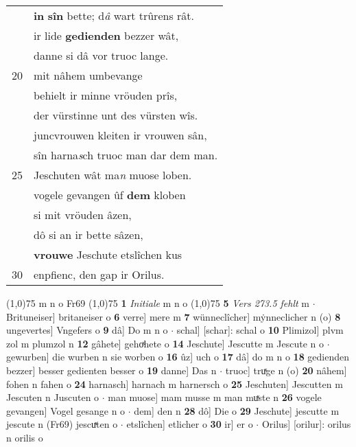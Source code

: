 \documentclass[8pt,a4paper,notitlepage]{article}
\begin{document}
\begin{table}[ht]
\begin{minipage}[t]{0.5\linewidth}
\begin{tabular}{rl}
 & \textbf{in} \textbf{sîn} bette; d\textit{â} wart trûrens rât.\\ 
 & ir lide \textbf{gedienden} bezzer wât,\\ 
 & danne si dâ vor truoc lange.\\ 
20 & mit nâhem umbevange\\ 
 & behielt ir minne vröuden prîs,\\ 
 & der vürstinne unt des vürsten wîs.\\ 
 & juncvrouwen kleiten ir vrouwen sân,\\ 
 & sîn harna\textit{s}ch truoc man dar dem man.\\ 
25 & Jeschuten wât ma\textit{n} muose loben.\\ 
 & vogele gevangen ûf \textbf{dem} kloben\\ 
 & si mit vröuden âzen,\\ 
 & dô si an ir bette sâzen,\\ 
 & \textbf{vrouwe} Jeschute etslîchen kus\\ 
30 & enpfienc, den gap ir Orilus.\\ 
\end{tabular}
\scriptsize
\line(1,0){75} \newline
m n o Fr69 \newline
\line(1,0){75} \newline
\textbf{1} \textit{Initiale} m n o  \newline
\line(1,0){75} \newline
\textbf{5} \textit{Vers 273.5 fehlt} m   $\cdot$ Brituneiser] britaneiser o \textbf{6} verre] mere m \textbf{7} wünneclîcher] mẏnneclicher n (o) \textbf{8} ungevertes] Vngefers o \textbf{9} dâ] Do m n o  $\cdot$ schal] [schar]: schal o \textbf{10} Plimizol] plvm zol m plumzol n \textbf{12} gâhete] gehoͯhete o \textbf{14} Jeschute] Jescutte m Jescute n o  $\cdot$ gewurben] die wurben n sie worben o \textbf{16} ûz] uch o \textbf{17} dâ] do m n o \textbf{18} gedienden bezzer] besser gedienten besser o \textbf{19} danne] Das n  $\cdot$ truoc] truͯge n (o) \textbf{20} nâhem] fohen n fahen o \textbf{24} harnasch] harnach m harnersch o \textbf{25} Jeschuten] Jescutten m Jescuten n Juscuten o  $\cdot$ man muose] mam musse m man muͯste n \textbf{26} vogele gevangen] Vogel gesange n o  $\cdot$ dem] den n \textbf{28} dô] Die o \textbf{29} Jeschute] jescutte m jescute n (Fr69) jescuͯten o  $\cdot$ etslîchen] etlicher o \textbf{30} ir] er o  $\cdot$ Orilus] [orilur]: orilus n orilis o \newline
\end{minipage}
\end{table}
\end{document}

